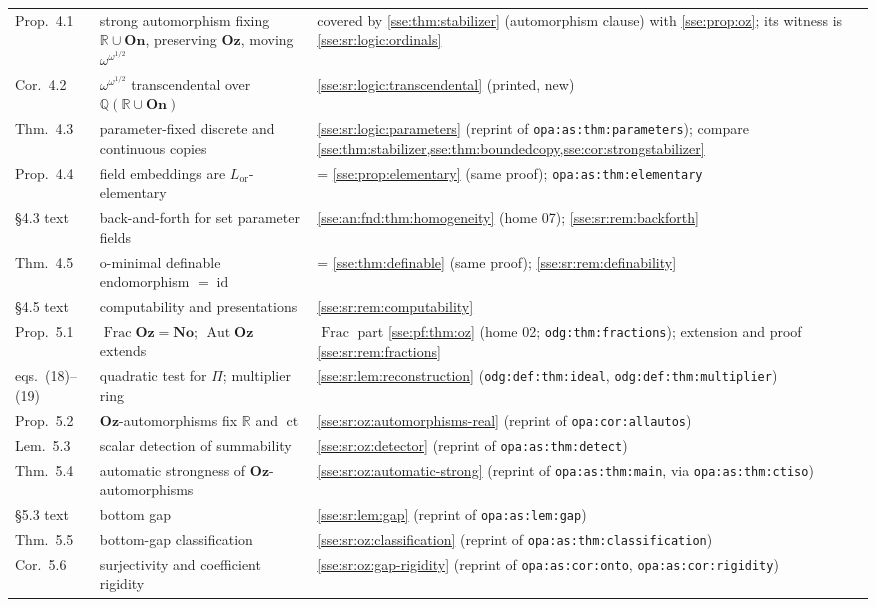 \documentclass[11pt,a4paper]{article}
\numberwithin{equation}{section}
\theoremstyle{plain}
\theoremstyle{definition}
\theoremstyle{remark}
\newcommand{\No}{\mathbf{No}}
\newcommand{\Oz}{\mathbf{Oz}}
\newcommand{\On}{\mathbf{On}}
\newcommand{\R}{\mathbb{R}}
\newcommand{\Q}{\mathbb{Q}}
\newcommand{\id}{\operatorname{id}}
\newcommand{\lbl}[1]{\nolinkurl{#1}}%
\newcommand{\ctsr}{\operatorname{ct}}%
\begin{document}
\begin{longtable}{P{17mm}P{52mm}P{79mm}}
Prop.~4.1 & strong automorphism fixing $\R\cup\On$, preserving $\Oz$, moving $\omega^{\omega^{1/2}}$ & covered by \cref{sse:thm:stabilizer} (automorphism clause) with \cref{sse:prop:oz}; its witness is \cref{sse:sr:logic:ordinals} \\
Cor.~4.2 & $\omega^{\omega^{1/2}}$ transcendental over $\Q(\R\cup\On)$ & \cref{sse:sr:logic:transcendental} (printed, new) \\
Thm.~4.3 & parameter-fixed discrete and continuous copies & \cref{sse:sr:logic:parameters} (reprint of \lbl{opa:as:thm:parameters}); compare \cref{sse:thm:stabilizer,sse:thm:boundedcopy,sse:cor:strongstabilizer} \\
Prop.~4.4 & field embeddings are $L_{\mathrm{or}}$-elementary & = \cref{sse:prop:elementary} (same proof); \lbl{opa:as:thm:elementary} \\
\S4.3 text & back-and-forth for set parameter fields & \cref{sse:an:fnd:thm:homogeneity} (home 07); \cref{sse:sr:rem:backforth} \\
Thm.~4.5 & o-minimal definable endomorphism $=\id$ & = \cref{sse:thm:definable} (same proof); \cref{sse:sr:rem:definability} \\
\S4.5 text & computability and presentations & \cref{sse:sr:rem:computability} \\
Prop.~5.1 & $\operatorname{Frac}\Oz=\No$; $\operatorname{Aut}\Oz$ extends & $\operatorname{Frac}$ part \cref{sse:pf:thm:oz} (home 02; \lbl{odg:thm:fractions}); extension and proof \cref{sse:sr:rem:fractions} \\
eqs.~(18)--(19) & quadratic test for $\Pi$; multiplier ring & \cref{sse:sr:lem:reconstruction} (\lbl{odg:def:thm:ideal}, \lbl{odg:def:thm:multiplier}) \\
Prop.~5.2 & $\Oz$-automorphisms fix $\R$ and $\ctsr$ & \cref{sse:sr:oz:automorphisms-real} (reprint of \lbl{opa:cor:allautos}) \\
Lem.~5.3 & scalar detection of summability & \cref{sse:sr:oz:detector} (reprint of \lbl{opa:as:thm:detect}) \\
Thm.~5.4 & automatic strongness of $\Oz$-automorphisms & \cref{sse:sr:oz:automatic-strong} (reprint of \lbl{opa:as:thm:main}, via \lbl{opa:as:thm:ctiso}) \\
\S5.3 text & bottom gap & \cref{sse:sr:lem:gap} (reprint of \lbl{opa:as:lem:gap}) \\
Thm.~5.5 & bottom-gap classification & \cref{sse:sr:oz:classification} (reprint of \lbl{opa:as:thm:classification}) \\
Cor.~5.6 & surjectivity and coefficient rigidity & \cref{sse:sr:oz:gap-rigidity} (reprint of \lbl{opa:as:cor:onto}, \lbl{opa:as:cor:rigidity}) \\

\end{longtable}
\end{document}
